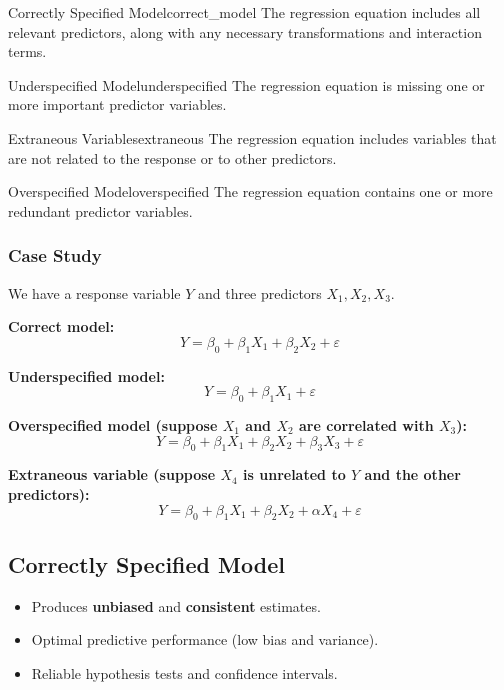\begin{defn}{Correctly Specified Model}{correct_model}
The regression equation includes all relevant predictors, along with any necessary transformations and interaction terms.
\end{defn}

\begin{defn}{Underspecified Model}{underspecified}
The regression equation is missing one or more important predictor variables.
\end{defn}

\begin{defn}{Extraneous Variables}{extraneous}
The regression equation includes variables that are not related to the response or to other predictors.
\end{defn}

\begin{defn}{Overspecified Model}{overspecified}
The regression equation contains one or more redundant predictor variables.
\end{defn}

\subsubsection*{Case Study}

We have a response variable $Y$ and three predictors $X_1, X_2, X_3$.

\textbf{Correct model:}
\[
Y = \beta_0 + \beta_1 X_1 + \beta_2 X_2 + \varepsilon
\]

\textbf{Underspecified model:}
\[
Y = \beta_0 + \beta_1 X_1 + \varepsilon
\]

\textbf{Overspecified model (suppose $X_1$ and $X_2$ are correlated with $X_3$):}
\[
Y = \beta_0 + \beta_1 X_1 + \beta_2 X_2 + \beta_3 X_3 + \varepsilon
\]

\textbf{Extraneous variable (suppose $X_4$ is unrelated to $Y$ and the other predictors):}
\[
Y = \beta_0 + \beta_1 X_1 + \beta_2 X_2 + \alpha X_4 + \varepsilon
\]

\subsection{Correctly Specified Model}

\begin{keyresult}
\begin{itemize}
\item Produces \textbf{unbiased} and \textbf{consistent} estimates.
\item Optimal predictive performance (low bias and variance).
\item Reliable hypothesis tests and confidence intervals.
\end{itemize}
\end{keyresult}

